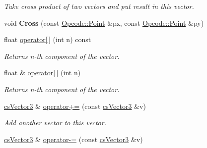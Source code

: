 \begin{DoxyCompactItemize}
\begin{DoxyCompactList}\small\item\em Take cross product of two vectors and put result in this vector. \end{DoxyCompactList}\item 
void {\bfseries Cross} (const \hyperlink{classOpcode_1_1Point}{Opcode\+::\+Point} \&px, const \hyperlink{classOpcode_1_1Point}{Opcode\+::\+Point} \&py)\hypertarget{classcsVector3_ac34b4515d13a0843ca798c64d7bef750}{}\label{classcsVector3_ac34b4515d13a0843ca798c64d7bef750}

\item 
float \hyperlink{classcsVector3_a0a0d701e92a23d0eb90e56bb3b17cf16}{operator\mbox{[}$\,$\mbox{]}} (int n) const \hypertarget{classcsVector3_a0a0d701e92a23d0eb90e56bb3b17cf16}{}\label{classcsVector3_a0a0d701e92a23d0eb90e56bb3b17cf16}

\begin{DoxyCompactList}\small\item\em Returns n-\/th component of the vector. \end{DoxyCompactList}\item 
float \& \hyperlink{classcsVector3_af3d7eeb816f1cfb47319af2ccd73654f}{operator\mbox{[}$\,$\mbox{]}} (int n)\hypertarget{classcsVector3_af3d7eeb816f1cfb47319af2ccd73654f}{}\label{classcsVector3_af3d7eeb816f1cfb47319af2ccd73654f}

\begin{DoxyCompactList}\small\item\em Returns n-\/th component of the vector. \end{DoxyCompactList}\item 
\hyperlink{classcsVector3}{cs\+Vector3} \& \hyperlink{classcsVector3_a4af056573151e79dcad7b24d459de7eb}{operator+=} (const \hyperlink{classcsVector3}{cs\+Vector3} \&v)\hypertarget{classcsVector3_a4af056573151e79dcad7b24d459de7eb}{}\label{classcsVector3_a4af056573151e79dcad7b24d459de7eb}

\begin{DoxyCompactList}\small\item\em Add another vector to this vector. \end{DoxyCompactList}\item 
\hyperlink{classcsVector3}{cs\+Vector3} \& \hyperlink{classcsVector3_a0677b4ef702018e0186600a1027ef101}{operator-\/=} (const \hyperlink{classcsVector3}{cs\+Vector3} \&v)\hypertarget{classcsVector3_a0677b4ef702018e0186600a1027ef101}{}\label{classcsVector3_a0677b4ef702018e0186600a1027ef101}


\end{DoxyCompactItemize}
